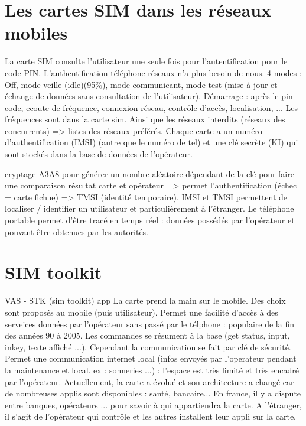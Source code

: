 \documentclass[a4paper,12pt]{article}
\begin{document}
\section{Les cartes SIM dans les réseaux mobiles}

La carte SIM consulte l'utilisateur une seule fois pour l'autentification pour le code PIN. L'authentification téléphone réseaux n'a plus besoin de nous.
4 modes : Off, mode veille (idle)(95\%), mode communicant, mode test (mise à jour et échange de données sans consultation de l'utilisateur).
Démarrage : après le pin code, ecoute de fréquence, connexion réseau, contrôle d'accès, localisation, ...
Les fréquences sont dans la carte sim. Ainsi que les réseaux interdits (réseaux des concurrents) => listes des réseaux préférés.
Chaque carte a un numéro d'authentification (IMSI) (autre que le numéro de tel) et une clé secrète (KI) qui sont stockés dans la base de données de l'opérateur.

cryptage A3A8 pour générer un nombre aléatoire dépendant de la clé pour faire une comparaison résultat carte et opérateur => permet l'authentification (échec = carte fichue) => TMSI (identité temporaire).
IMSI et TMSI permettent de localiser / identifier un utilisateur et particulièrement à l'étranger. Le téléphone portable permet d'être tracé en temps réel : données possédés par l'opérateur et pouvant être obtenues par les autorités. 

\section{SIM toolkit}

VAS - STK (sim toolkit) app
La carte prend la main sur le mobile. Des choix sont proposés au mobile (puis utilisateur). Permet une facilité d'accès à des serveices données par l'opérateur sans passé par le télphone : populaire de la fin des années 90 à 2005. Les commandes se résument à la base (get status, input, inkey, texte affiché ...). Cependant la communication se fait par clé de sécurité. Permet une communication internet local (infos envoyés par l'operateur pendant la maintenance et local. ex : sonneries ...) : l'espace est très limité et très encadré par l'opérateur.
Actuellement, la carte a évolué et son architecture a changé car de nombreuses applis sont disponibles : santé, bancaire...
En france, il y a dispute entre banques, opérateurs ... pour savoir à qui appartiendra la carte. A l'étranger, il s'agit de l'opérateur qui contrôle et les autres installent leur appli sur la carte.
\end{document}
